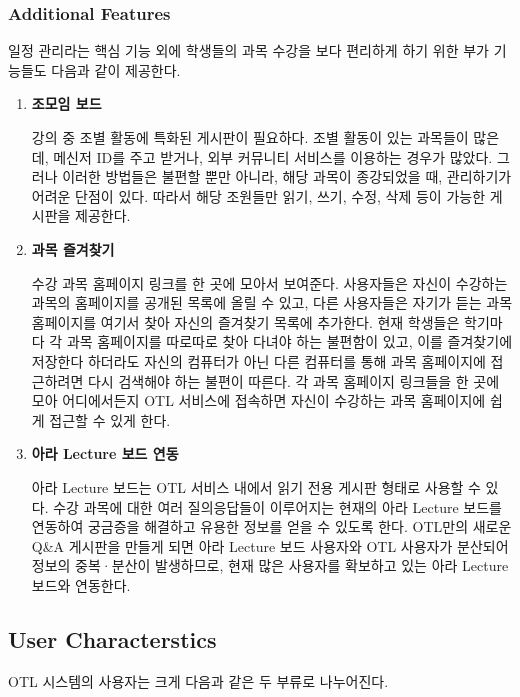 \documentclass[a4paper,titlepage]{article}
\begin{document}
\subsubsection{Additional Features}
일정 관리라는 핵심 기능 외에 학생들의 과목 수강을 보다 편리하게 하기 위한 부가 기능들도 다음과 같이 제공한다.
\begin{enumerate}
	\item\textbf{조모임 보드}

	강의 중 조별 활동에 특화된 게시판이 필요하다.
	조별 활동이 있는 과목들이 많은데, 메신저 ID를 주고 받거나, 외부 커뮤니티 서비스를 이용하는 경우가 많았다.
	그러나 이러한 방법들은 불편할 뿐만 아니라, 해당 과목이 종강되었을 때, 관리하기가 어려운 단점이 있다. 
	따라서 해당 조원들만 읽기, 쓰기, 수정, 삭제 등이 가능한 게시판을 제공한다. 

	\item\textbf{과목 즐겨찾기}

	수강 과목 홈페이지 링크를 한 곳에 모아서 보여준다.
	사용자들은 자신이 수강하는 과목의 홈페이지를 공개된 목록에 올릴 수 있고, 다른 사용자들은 자기가 듣는 과목 홈페이지를 여기서 찾아 자신의 즐겨찾기 목록에 추가한다.
	현재 학생들은 학기마다 각 과목 홈페이지를 따로따로 찾아 다녀야 하는 불편함이 있고, 이를 즐겨찾기에 저장한다 하더라도 자신의 컴퓨터가 아닌 다른 컴퓨터를 통해 과목 홈페이지에 접근하려면 다시 검색해야 하는 불편이 따른다.
	각 과목 홈페이지 링크들을 한 곳에 모아 어디에서든지 OTL 서비스에 접속하면 자신이 수강하는 과목 홈페이지에 쉽게 접근할 수 있게 한다. 

	\item\textbf{아라 Lecture 보드 연동}

	아라 Lecture 보드는 OTL 서비스 내에서 읽기 전용 게시판 형태로 사용할 수 있다.
	수강 과목에 대한 여러 질의응답들이 이루어지는 현재의 아라 Lecture 보드를 연동하여 궁금증을 해결하고 유용한 정보를 얻을 수 있도록 한다.
	OTL만의 새로운 Q\&A 게시판을 만들게 되면 아라 Lecture 보드 사용자와 OTL 사용자가 분산되어 정보의 중복·분산이 발생하므로, 현재 많은 사용자를 확보하고 있는 아라 Lecture 보드와 연동한다.

\end{enumerate}

\subsection{User Characterstics}

OTL 시스템의 사용자는 크게 다음과 같은 두 부류로 나누어진다.
\end{document}

